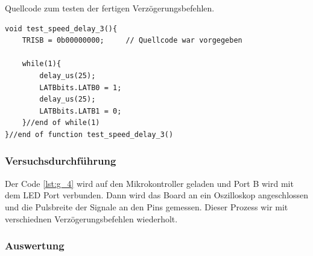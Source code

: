 \documentclass[12pt,a4paper]{article}
\begin{document}
Quellcode zum testen der fertigen Verzögerungsbefehlen.

\lstset{language=C, basicstyle=\tiny}
\begin{lstlisting}[caption = {Geschwindigkeitstest mit den fertigen Verzögerungsbefehlen}, label=lst:g_4,captionpos=b]
void test_speed_delay_3(){
	TRISB = 0b00000000;		// Quellcode war vorgegeben
	
	while(1){
		delay_us(25);
		LATBbits.LATB0 = 1;
		delay_us(25);
		LATBbits.LATB1 = 0;
	}//end of while(1)
}//end of function test_speed_delay_3()
\end{lstlisting}



\subsubsection*{Versuchsdurchführung}

Der Code \ref{lst:g_4} wird auf den Mikrokontroller geladen und Port B wird mit dem LED Port verbunden. Dann wird das Board an ein Oszilloskop angeschlossen und die Pulsbreite der Signale an den Pins gemessen. Dieser Prozess wir mit verschiednen Verzögerungsbefehlen wiederholt.


\subsubsection*{Auswertung}
\end{document}
